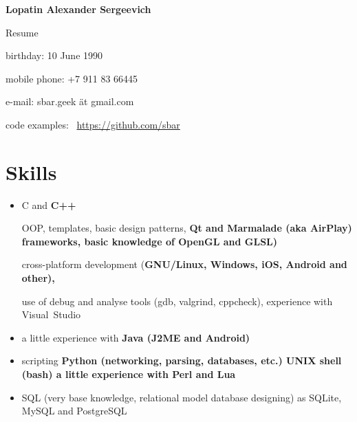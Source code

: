 \begin{center}
\fontsize{16pt}{14pt}\selectfont
\bfseries Lopatin Alexander Sergeevich\mdseries

\fontsize{14pt}{14pt}\selectfont
Resume
\end{center}

{
\fontsize{12pt}{12pt}\selectfont
\begin{flushright}
\item birthday: 10 June 1990
\item mobile phone: +7 911 83 66445
\item e-mail: sbar.geek ät gmail.com
\item code examples: \
\href{https://github.com/sbar?tab=repositories}{https://github.com/sbar}
\end{flushright}
}

\section{Skills}
\begin{itemize}
\item C and \bfseries C++\mdseries

\subitem OOP, templates, basic design patterns,
\bfseries Qt \mdseries and
\bfseries Marmalade \mdseries (aka \bfseries AirPlay\mdseries) frameworks,
basic knowledge of \bfseries OpenGL \mdseries and \bfseries GLSL\mdseries)

\subitem cross-platform development
(\bfseries GNU/Linux\mdseries, Windows, iOS,
\bfseries Android \mdseries and other),

\subitem use of debug and analyse tools (gdb, valgrind, cppcheck),
experience with Visual~Studio

\item a little experience with \bfseries Java \mdseries (J2ME and Android)

\item scripting
\subitem \bfseries Python \mdseries (networking, parsing, databases, etc.)
\subitem \bfseries UNIX shell (bash)\mdseries
\subitem a little experience with
\bfseries Perl \mdseries and \bfseries Lua\mdseries

\item SQL (very base knowledge, relational model database designing)
as SQLite, MySQL and PostgreSQL
\end{itemize}

